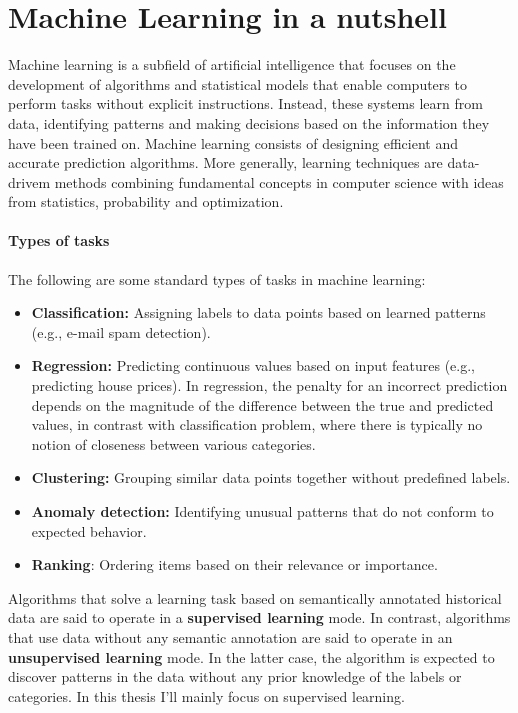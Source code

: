 \setlength{\headheight}{14.5pt} %
\addtolength{\topmargin}{-2.5pt} %
\chapter{Machine Learning in a nutshell} 

Machine learning is a subfield of artificial intelligence that focuses on the development of algorithms and statistical models that enable computers to perform tasks without explicit instructions. Instead, these systems learn from data, identifying patterns and making decisions based on the information they have been trained on.
Machine learning consists of designing efficient and accurate prediction algorithms. More generally, learning techniques are data-drivem methods combining fundamental concepts in computer science with ideas from statistics, probability and optimization.
\subsubsection{Types of tasks}
The following are some standard types of tasks in machine learning:
\begin{itemize}
    \item \textbf{Classification:} Assigning labels to data points based on learned patterns (e.g., e-mail spam detection).
    \item \textbf{Regression:} Predicting continuous values based on input features (e.g., predicting house prices). In regression, the penalty for an incorrect prediction depends on the magnitude of the difference between the true and predicted values, in contrast with classification problem, where there is typically no notion of closeness between various categories. 
    \item \textbf{Clustering:} Grouping similar data points together without predefined labels.
    \item \textbf{Anomaly detection:} Identifying unusual patterns that do not conform to expected behavior.
    \item \textbf{Ranking}: Ordering items based on their relevance or importance.
\end{itemize}

Algorithms that solve a learning task based on semantically annotated historical data are said to operate in a \textbf{supervised learning} mode. In contrast, algorithms that use data without any semantic annotation are said to operate in an \textbf{unsupervised learning} mode. In the latter case, the algorithm is expected to discover patterns in the data without any prior knowledge of the labels or categories.
In this thesis I'll mainly focus on supervised learning. 

